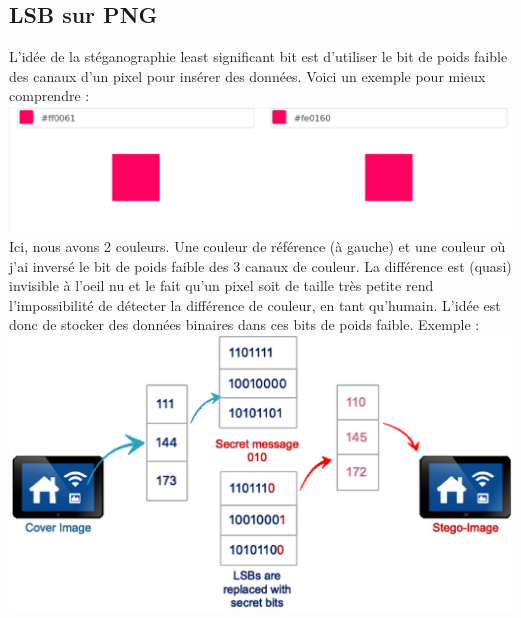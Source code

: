 \subsection{LSB sur PNG}
L'idée de la stéganographie least significant bit est d'utiliser le bit de poids faible des canaux d'un pixel pour insérer des données.
\newline
Voici un exemple pour mieux comprendre :
\newline
\includegraphics[width=1\textwidth]{img/color_comparaison.eps}
Ici, nous avons 2 couleurs. Une couleur de référence (à gauche) et une couleur où j'ai inversé le bit de poids faible des 3 canaux de couleur.
\newline
La différence est (quasi) invisible à l'oeil nu et le fait qu'un pixel soit de taille très petite rend l'impossibilité de détecter la différence de couleur, en tant qu'humain.
\newline
\newline
L'idée est donc de stocker des données binaires dans ces bits de poids faible. Exemple :
\newline
\includegraphics[width=1\textwidth]{img/LSB-image-steganography.eps}